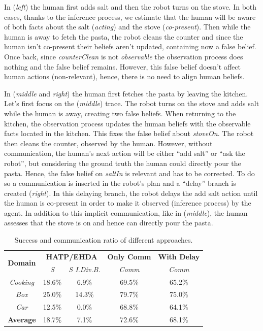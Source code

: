 In (\textit{left}) the human first adds salt and then the robot turns on the stove. In both cases, thanks to the inference process, we estimate that the human will be aware of both facts about the salt (\textit{acting}) and the stove (\textit{co-present}). Then while the human is away to fetch the pasta, the robot cleans the counter and since the human isn't co-present their beliefs aren't updated, containing now a false belief. Once back, since \textit{counterClean} is not \textit{observable} the observation process does nothing and the false belief remains. However, this false belief doesn't affect human actions (non-relevant), hence, there is no need to align human beliefs.

In (\textit{middle} and \textit{right}) the human first fetches the pasta by leaving the kitchen. Let's first focus on the (\textit{middle}) trace. The robot turns on the stove and adds salt while the human is away, creating two false beliefs. When returning to the kitchen, the observation process updates the human beliefs with the observable facts located in the kitchen. This fixes the false belief about \textit{stoveOn}. The robot then cleans the counter, observed by the human. 
However, without communication, the human's next action will be either ``add salt'' or ``ask the robot'', but considering the ground truth the human could directly pour the pasta. Hence, the false belief on \textit{saltIn} is relevant and has to be corrected. To do so a communication is inserted in the robot's plan and a ``delay'' branch is created (\textit{right}). 
In this delaying branch, the robot delays the add salt action until the human is co-present in order to make it observed (inference process) by the agent. 
In addition to this implicit communication, like in (\textit{middle}), the human assesses that the stove is on and hence can directly pour the pasta. 
\begin{table}[t]
    \centering
    \vspace{0.1cm}
    \caption
    {
    Success and communication ratio of different approaches. 
    }
    \label{tab:q_results}
    \begin{tabular}{@{}c|c c|| c| c@{}}
        \multirow{2}{*}{\textbf{Domain}} & \multicolumn{2}{c||}{\textbf{HATP/EHDA}} & \multicolumn{1}{c|}{\textbf{Only Comm}} & \multicolumn{1}{c}{\textbf{With Delay}}
        \\
        & \multicolumn{1}{c}{\textit{S}} & \multicolumn{1}{c||}{\textit{S I.Div.B.}} & \multicolumn{1}{c|}{\textit{Comm}} & \multicolumn{1}{c}{\textit{Comm}} 
        \\ \cline{1-5}
        \textit{Cooking}    &   18.6\%  &  6.9\%    & 69.5\% & 65.2\%\\
        \textit{Box}        &   25.0\%  & 14.3\%    & 79.7\% & 75.0\%\\
        \textit{Car}        &   12.5\%  & 0.0\%     & 68.8\% & 64.1\%\\
        \hline
        \textbf{Average}    &   18.7\%  & 7.1\%     & 72.6\% & 68.1\%\\
    \end{tabular}
\end{table}

